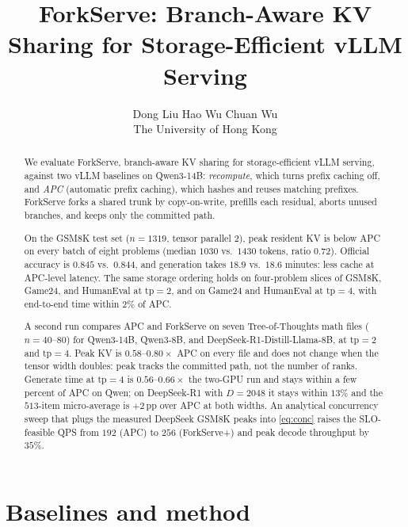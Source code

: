 \documentclass[11pt,a4paper]{article}
\title{\textbf{ForkServe: Branch-Aware KV\\[-0.12em]
Sharing for Storage-Efficient vLLM Serving}}
\author{%
\begin{tabular}[t]{c}
Dong Liu \hspace{1.4em} Hao Wu \hspace{1.4em} Chuan Wu \\[0.55em]
The University of Hong Kong
\end{tabular}%
}
\date{}
\begin{document}
\maketitle
\vspace{-1.6em}

\begin{abstract}
\noindent
We evaluate ForkServe, branch-aware KV sharing for storage-efficient vLLM serving, against two vLLM baselines on Qwen3-14B:
\emph{recompute}, which turns prefix caching off, and \emph{APC} (automatic prefix caching), which hashes and reuses matching prefixes.
ForkServe forks a shared trunk by copy-on-write, prefills each residual, aborts unused branches, and keeps only the committed path.

On the GSM8K test set ($n{=}1319$, tensor parallel $2$), peak resident KV is below APC on every batch of eight problems (median $1030$ vs.\ $1430$ tokens, ratio $0.72$).
Official accuracy is $0.845$ vs.\ $0.844$, and generation takes $18.9$ vs.\ $18.6$ minutes: less cache at APC-level latency.
The same storage ordering holds on four-problem slices of GSM8K, Game24, and HumanEval at $\mathrm{tp}{=}2$, and on Game24 and HumanEval at $\mathrm{tp}{=}4$, with end-to-end time within $2\%$ of APC.

A second run compares APC and ForkServe on seven Tree-of-Thoughts math files ($n{=}40$--$80$) for Qwen3-14B, Qwen3-8B, and DeepSeek-R1-Distill-Llama-8B, at $\mathrm{tp}{=}2$ and $\mathrm{tp}{=}4$.
Peak KV is $0.58$--$0.80\times$ APC on every file and does not change when the tensor width doubles: peak tracks the committed path, not the number of ranks.
Generate time at $\mathrm{tp}{=}4$ is $0.56$--$0.66\times$ the two-GPU run and stays within a few percent of APC on Qwen; on DeepSeek-R1 with $D{=}2048$ it stays within $13\%$ and the $513$-item micro-average is $+2$\,pp over APC at both widths.
An analytical concurrency sweep that plugs the measured DeepSeek GSM8K peaks into \eqref{eq:conc} raises the SLO-feasible QPS from $192$ (APC) to $256$ (ForkServe+) and peak decode throughput by $35\%$.
\end{abstract}

\section{Baselines and method}
\end{document}

